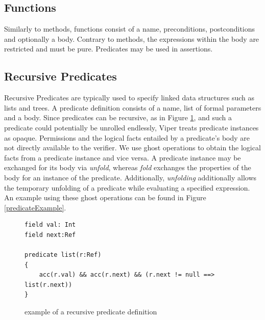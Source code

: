 \documentclass[12pt]{article}
\begin{document}
\subsection{Functions}
Similarly to methods, functions consist of a name, preconditions, postconditions and optionally a body. Contrary to methods, the expressions within the body are restricted and must be pure. Predicates may be used in assertions.

\subsection{Recursive Predicates}

Recursive Predicates \cite{parkinson2005separation} are typically used to specify linked data structures such as lists and trees. A predicate definition consists of a name,  list of formal parameters and a body. Since predicates can be recursive, as in Figure \ref{recursivePredicate}, and such a predicate could potentially be unrolled endlessly, Viper treats predicate instances as opaque. Permissions and the logical facts entailed by a predicate's body are not directly available to the verifier. We use ghost operations to obtain the logical facts from a predicate instance and vice versa.
A predicate instance may be exchanged for its body via \textit{unfold}, whereas \textit{fold} exchanges the properties of the body for an instance of the predicate. Additionally, \textit{unfolding} additionally allows the temporary unfolding of a predicate while evaluating a specified expression. An example using these ghost operations can be found in Figure \ref{predicateExample}.

\begin{figure}[h]
  \centering
\begin{lstlisting}
field val: Int
field next:Ref

predicate list(r:Ref)
{
    acc(r.val) && acc(r.next) && (r.next != null ==> list(r.next))
}
\end{lstlisting}
\caption[recursive predicate]
   {example of a recursive predicate definition}
\label{recursivePredicate}
\end{figure}
\end{document}
